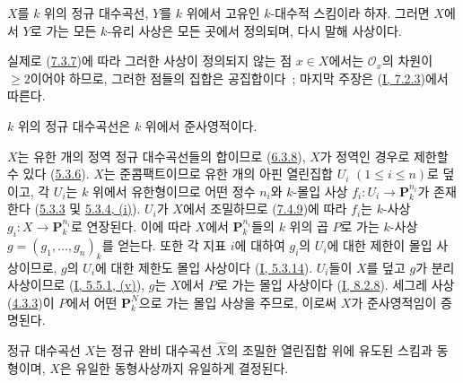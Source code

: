 \begin{proposition}[7.4.9]
\label{II.7.4.9-ko}
$X$를 $k$ 위의 정규 대수곡선, $Y$를 $k$ 위에서 고유인 $k$-대수적
스킴이라 하자. 그러면 $X$에서 $Y$로 가는 모든 $k$-유리 사상은 모든
곳에서 정의되며, 다시 말해 사상이다.
\end{proposition}

실제로 (\hyperref[II.7.3.7-ko]{7.3.7})에 따라 그러한 사상이 정의되지
않는 점 $x\in X$에서는 $\mathcal{O}_x$의 차원이 $\geq2$이어야 하므로,
그러한 점들의 집합은 공집합이다~; 마지막 주장은
(\hyperref[I.7.2.3-ko]{I, 7.2.3})에서 따른다.

\begin{corollary}[7.4.10]
\label{II.7.4.10-ko}
$k$ 위의 정규 대수곡선은 $k$ 위에서 준사영적이다.
\end{corollary}

$X$는 유한 개의 정역 정규 대수곡선들의 합이므로
(\hyperref[II.6.3.8-ko]{6.3.8}), $X$가 정역인 경우로 제한할 수 있다
(\hyperref[II.5.3.6-ko]{5.3.6}). $X$는 준콤팩트이므로 유한 개의 아핀
열린집합 $U_i$ $(1\leq i\leq n)$로 덮이고, 각 $U_i$는 $k$ 위에서
유한형이므로 어떤 정수 $n_i$와 $k$-몰입 사상
$f_i:U_i\to\mathbf{P}_k^{n_i}$가 존재한다
(\hyperref[II.5.3.3-ko]{5.3.3} 및
\hyperref[II.5.3.4-ko]{5.3.4, (i)}). $U_i$가 $X$에서 조밀하므로
(\hyperref[II.7.4.9-ko]{7.4.9})에 따라 $f_i$는 $k$-사상
$g_i:X\to\mathbf{P}_k^{n_i}$로 연장된다. 이에 따라 $X$에서
$\mathbf{P}_k^{n_i}$들의 $k$ 위의 곱 $P$로 가는 $k$-사상
$g=(g_1,\ldots,g_n)_k$를 얻는다. 또한 각 지표 $i$에 대하여 $g_i$의
$U_i$에 대한 제한이 몰입 사상이므로, $g$의 $U_i$에 대한 제한도
몰입 사상이다 (\hyperref[I.5.3.14-ko]{I, 5.3.14}). $U_i$들이 $X$를
덮고 $g$가 분리 사상이므로 (\hyperref[I.5.5.1-ko]{I, 5.5.1, (v)}),
$g$는 $X$에서 $P$로 가는 몰입 사상이다
(\hyperref[I.8.2.8-ko]{I, 8.2.8}). 세그레 사상
(\hyperref[II.4.3.3-ko]{4.3.3})이 $P$에서 어떤
$\mathbf{P}_k^N$으로 가는 몰입 사상을 주므로, 이로써 $X$가
준사영적임이 증명된다.

\begin{corollary}[7.4.11]
\label{II.7.4.11-ko}
정규 대수곡선 $X$는 정규 완비 대수곡선 $\widehat{X}$의 조밀한
열린집합 위에 유도된 스킴과 동형이며, $\widehat{X}$은 유일한
동형사상까지 유일하게 결정된다.
\end{corollary}

